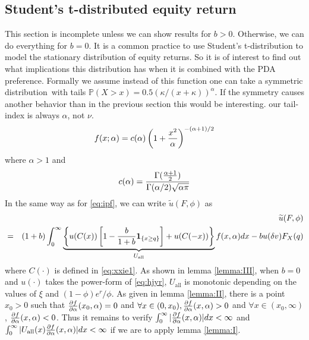 \documentclass[11pt,a4]{amsart}
\newcommand{\pd}{\partial}
\newcommand{\red}{\color{darkred}}
\newcommand{\blue}{\color{darkblue}}
\newcommand{\wt}{\widetilde}
\newcommand{\ds}{distribution}
\renewcommand{\P }{{\mathbb P}}
\newcommand{\1}{{\mathbf 1}}
\begin{document}
\subsection{Student's t-distributed equity return}
{\red This section is incomplete unless we can show results for $b>0$. Otherwise, we can do everything for $b=0$.} 
It is a common practice to use Student's t-distribution to model the
stationary distribution of equity returns. So it is of interest to
find out what implications this distribution has when it is combined
with the PDA preference. Formally we assume {\red instead of this function one can take a symmetric \ds\ with tails
$\P(X>x)=0.5 (\kappa/(x+\kappa))^{\alpha}$. If the symmetry causes another behavior than in the previous section this would be interesting.}
{\blue our tail-index is always $\alpha$, not $\nu$.}
\[
f(x; \alpha) = c(\alpha) \left(
  1 + {x^2 \over \alpha}
\right)^{-(\alpha + 1)/2}
\]
where $\alpha > 1$ and
\[
c(\alpha) = {
  \Gamma({\alpha + 1 \over 2})
  \over
  \Gamma(\alpha/2) \sqrt{\alpha \pi}
}
\]
In the same way as for \eqref{eq:ipf}, we can write $\wt u(F, \phi)$
as
\begin{eqnarray}
  && \wt u(F, \phi) \nonumber \\
  &=&
  (1 + b)
  \int_{0}^{\infty}
  \underbrace{
    \left\{
      u(C(x)) \left[
        1 - {b \over 1 + b}\1_{\{x \ge q\}}
        \right]
      + u(C(-x))
    \right\}
  }_{U_{\text{all}}}
  f(x, \alpha) dx
  - b u(\delta v) F_X(q)
  \label{eq:t1}
\end{eqnarray}
where $C(\cdot)$ is defined in \eqref{eq:xxie1}. As shown in lemma
\ref{lemma:III}, when $b = 0$ and $u(\cdot)$
takes the power-form of \eqref{eq:hjyr}, $U_{\text{all}}$ is monotonic
depending on the values of $\xi$ and $(1 - \phi) e^r / \phi$. As given
in lemma \ref{lemma:II}, there is a point $x_0 > 0$ such that
${\pd f \over \pd \alpha}(x_0, \alpha) = 0$ and
$\forall x \in (0, x_0),
{\pd f \over  \pd \alpha}(x, \alpha) > 0$ and
$\forall x \in (x_0, \infty)$,
${\pd f \over \pd \alpha}(x, \alpha) < 0$. Thus it remains to verify
$\int_0^\infty |{\pd f \over \pd \alpha}(x, \alpha)| dx < \infty$ and
$\int_0^\infty |U_{\text{all}}(x){\pd f \over \pd \alpha}(x, \alpha)| dx < \infty$
if we are to apply lemma \ref{lemma:I}.
\end{document}
